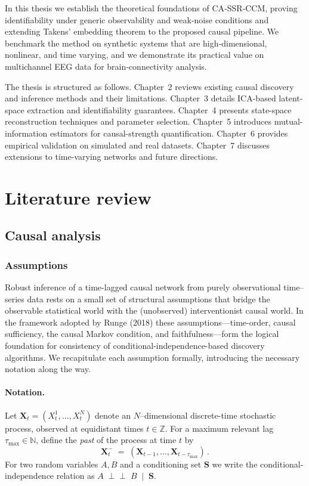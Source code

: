 \documentclass[14pt]{extarticle}
\begin{document}
	In this thesis we establish the theoretical foundations of CA‑SSR‑CCM, proving identifiability under generic observability and weak‑noise conditions and extending Takens’ embedding theorem to the proposed causal pipeline.  
	We benchmark the method on synthetic systems that are high‑dimensional, nonlinear, and time varying, and we demonstrate its practical value on multichannel EEG data for brain‑connectivity analysis. 
	
	The thesis is structured as follows.  
	Chapter~2 reviews existing causal discovery and inference methods and their limitations.  
	Chapter~3 details ICA-based latent-space extraction and identifiability guarantees.  
	Chapter~4 presents state-space reconstruction techniques and parameter selection.  
	Chapter~5 introduces mutual-information estimators for causal-strength quantification.  
	Chapter~6 provides empirical validation on simulated and real datasets.  
	Chapter~7 discusses extensions to time-varying networks and future directions.  
	
	\section{Literature review}
	
	\subsection{Causal analysis}
	
	\subsubsection{Assumptions}\label{subsubsec:causal_assumptions}
	
	Robust inference of a time-lagged causal network from purely observational time–series data rests on a small set of structural assumptions that bridge the observable statistical world with the (unobserved) interventionist causal world.  In the framework adopted by Runge (2018) these assumptions—time-order, causal sufficiency, the causal Markov condition, and faithfulness—form the logical foundation for consistency of conditional-independence-based discovery algorithms. We recapitulate each assumption formally, introducing the necessary notation along the way.  
	
	\paragraph*{Notation.}
	Let $\mathbf X_t=(X^1_t,\dots,X^N_t)$ denote an $N$–dimensional discrete-time stochastic process, observed at equidistant times $t\in\mathbb Z$.  
	For a maximum relevant lag $\tau_{\max}\in\mathbb N$, define the \emph{past} of the process at time $t$ by  
	$$
	\mathbf X_{t}^{-}\;=\;(\mathbf X_{t-1},\dots,\mathbf X_{t-\tau_{\max}})\, .
	$$
	For two random variables $A,B$ and a conditioning set $\mathbf S$ we write the conditional-independence relation as  
	$
	A\;\perp\!\!\!\perp\;B\;\mid\;\mathbf S .
	$  
	
\end{document}
